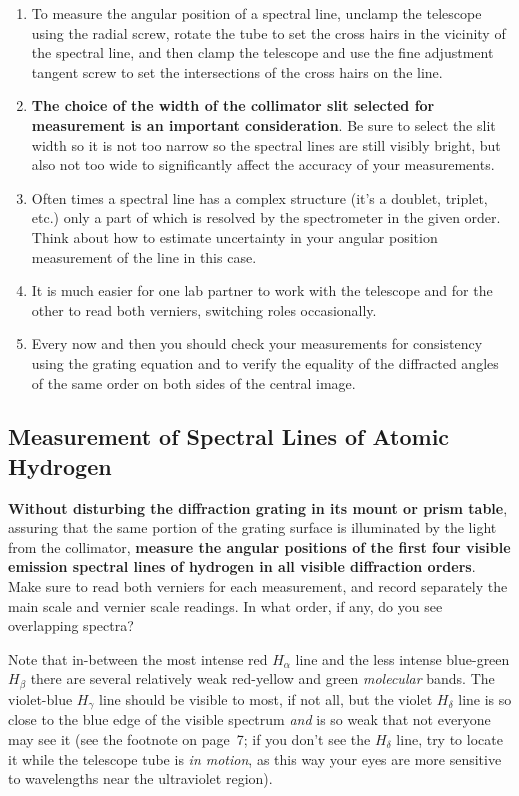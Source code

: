 \documentclass[12pt]{article}
\begin{document}
\begin{enumerate}
    \item To measure the angular position of a spectral line, unclamp the telescope using the radial screw, rotate the tube to set the cross hairs in the vicinity of the spectral line, and then clamp the telescope and use the fine adjustment tangent screw to set the intersections of the cross hairs on the line.
    \item \textbf{The choice of the width of the collimator slit selected for measurement is an important consideration}. Be sure to select the slit width so it is not too narrow so the spectral lines are still visibly bright, but also not too wide to significantly affect the accuracy of your measurements.
    \item Often times a spectral line has a complex structure (it's a doublet, triplet, etc.) only a part of which is resolved by the spectrometer in the given order. Think about how to estimate uncertainty in your angular position measurement of the line in this case.
    \item It is much easier for one lab partner to work with the telescope and for the other to read both verniers, switching roles occasionally.
    \item Every now and then you should check your measurements for consistency using the grating equation and to verify the equality of the diffracted angles of the same order on both sides of the central image.
\end{enumerate}

\subsection{Measurement of Spectral Lines of Atomic Hydrogen}

\textbf{Without disturbing the diffraction grating in its mount or prism table}, assuring that the same portion of the grating surface is illuminated by the light from the collimator, \textbf{measure the angular positions of the first four visible emission spectral lines of hydrogen in all visible diffraction orders}. Make sure
to read both verniers for each measurement, and record separately the main scale and vernier scale readings. In what order, if any, do you see overlapping spectra?

Note that in-between the most intense red $H_{\alpha}$ line and the less intense blue-green $H_{\beta}$ there are several relatively weak red-yellow and green \textit{molecular} bands. The violet-blue $H_{\gamma}$ line should be visible to most, if not all, but the violet $H_{\delta}$ line is so close to the blue edge of the visible spectrum \textit{and} is so weak that not everyone may see it (see the footnote on page~7; if you don't see the $H_{\delta}$ line, try to locate it while the telescope tube is \textit{in motion}, as this way your eyes are more sensitive to wavelengths near the ultraviolet region).
\end{document}
